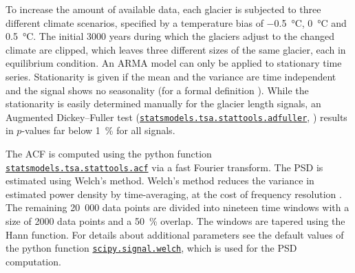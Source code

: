        To increase the amount of available data, each glacier is subjected to three different climate scenarios, specified by a temperature bias of \SI{-0.5}{\celsius}, \SI{0}{\celsius} and \SI{+0.5}{\celsius}. The initial 3000 years during which the glaciers adjust to the changed climate are clipped, which leaves three different sizes of the same glacier, each in equilibrium condition. An ARMA model can only be applied to stationary time series. Stationarity is given if the mean and the variance are time independent and the signal shows no seasonality (for a formal definition \citet[e.g.,][]{BoxJenkins2015}). While the stationarity is easily determined manually for the glacier length signals, an Augmented Dickey--Fuller test (\href{https://www.statsmodels.org/devel/generated/statsmodels.tsa.stattools.adfuller.html}{\lstinline`statsmodels.tsa.stattools.adfuller`}, \citet{Cheung1995-ADFuller}) results in $p$-values far below \SI{1}{\percent} for all signals.

        The ACF is computed using the python function \href{https://www.statsmodels.org/devel/generated/statsmodels.tsa.stattools.acf.html}{\lstinline`statsmodels.tsa.stattools.acf`} via a fast Fourier transform. The PSD is estimated using Welch's method. Welch's method reduces the variance in  estimated power density by time-averaging, at the cost of frequency resolution \citep[e.g.,][]{Welch1967, Proakis2007}.  The remaining 20\ 000 data points are divided into nineteen time windows with a size of 2000 data points and a \SI{50}{\percent} overlap. The windows are tapered using the Hann function. For details about additional parameters see the default values of the python function \href{https://docs.scipy.org/doc/scipy/reference/generated/scipy.signal.welch.html}{\lstinline`scipy.signal.welch`}, which is used for the PSD computation.
    

